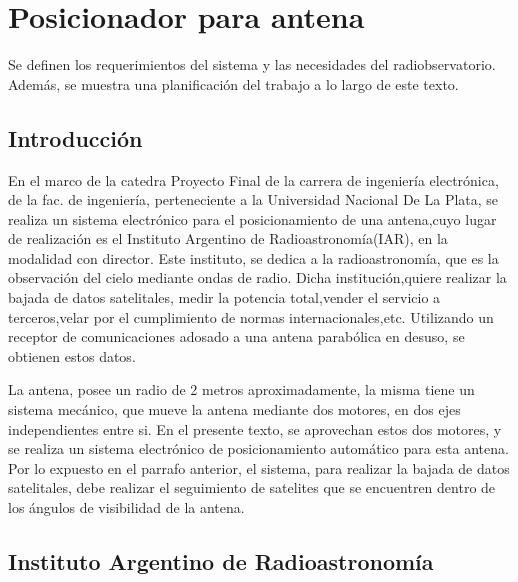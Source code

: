 \renewcommand{\chaptername}{Requerimientos para estación terrena}
\chapter{Posicionador para antena }
\begin{center}
\begin{tcolorbox}[colback=gray!5!white, %
colframe=gray!75!black,
title= \center{\Large{Resumen}} ]

Se definen los requerimientos del sistema y las necesidades del radiobservatorio. Además, se muestra una planificación del trabajo a lo largo de este texto. 
\end{tcolorbox}
\end{center}    
\section{Introducción}  %
En el marco de la catedra Proyecto Final de la carrera de ingeniería electrónica, de la fac. de ingeniería, perteneciente a la Universidad Nacional De La Plata, se realiza un sistema electrónico para el  posicionamiento de una antena,cuyo lugar de realización es el Instituto Argentino de Radioastronomía(IAR), en la modalidad con director. Este instituto, se dedica a la radioastronomía, que es la observación del cielo mediante ondas de radio. Dicha institución,quiere realizar la bajada de datos satelitales, medir la potencia total,vender el servicio a terceros,velar por el cumplimiento de normas internacionales,etc. Utilizando un receptor de comunicaciones adosado a una antena parabólica en desuso, se obtienen estos datos. 

La antena, posee un radio de 2 metros aproximadamente, la misma tiene un sistema mecánico, que mueve la antena mediante dos motores, en dos ejes independientes entre si. En el presente texto, se aprovechan estos dos motores, y se realiza un sistema electrónico de posicionamiento automático para esta antena. Por lo expuesto en el parrafo anterior, el sistema, para realizar la bajada de datos satelitales, debe realizar el seguimiento de satelites que se encuentren dentro de los ángulos de visibilidad de la antena.

\section{Instituto Argentino de Radioastronomía} 

